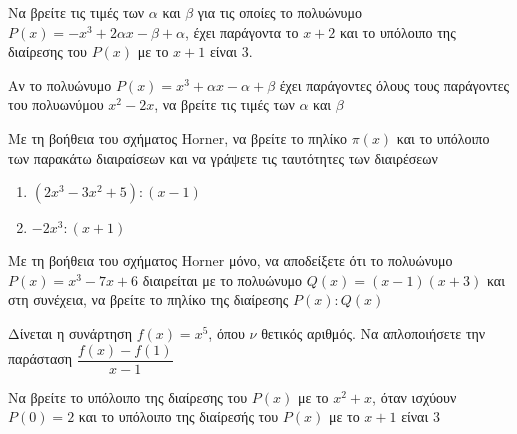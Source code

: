 \documentclass{../presentation}
\begin{document}
\begin{askisi}
  Να βρείτε τις τιμές των $α$ και $β$ για τις οποίες το πολυώνυμο $P(x)=-x^3+2αx-β+α$, έχει παράγοντα το $x+2$ και το υπόλοιπο της διαίρεσης του $P(x)$ με το $x+1$ είναι 3.


\end{askisi}

\begin{askisi}
  Αν το πολυώνυμο $P(x)=x^3+αx-α+β$ έχει παράγοντες όλους τους παράγοντες του πολυωνύμου $x^2-2x$, να βρείτε τις τιμές των $α$ και $β$


\end{askisi}

\begin{askisi}
  Με τη βοήθεια του σχήματος Horner, να βρείτε το πηλίκο $π(x)$ και το υπόλοιπο των παρακάτω διαιραίσεων και να γράψετε τις ταυτότητες των διαιρέσεων
  \begin{enumerate}
    \item<1-> $(2x^3-3x^2+5):(x-1)$
    \item<2-> $-2x^3:(x+1)$
  \end{enumerate}


\end{askisi}

\begin{askisi}
  Με τη βοήθεια του σχήματος Horner μόνο, να αποδείξετε ότι το πολυώνυμο $P(x)=x^3-7x+6$ διαιρείται με το πολυώνυμο $Q(x)=(x-1)(x+3)$ και στη συνέχεια, να βρείτε το πηλίκο της διαίρεσης $P(x):Q(x)$


\end{askisi}

\begin{askisi}
  Δίνεται η συνάρτηση $f(x)=x^5$, όπου $ν$ θετικός αριθμός. Να απλοποιήσετε την παράσταση $\dfrac{f(x)-f(1)}{x-1}$


\end{askisi}

\begin{askisi}
  Να βρείτε το υπόλοιπο της διαίρεσης του $P(x)$ με το $x^2+x$, όταν ισχύουν $P(0)=2$ και το υπόλοιπο της διαίρεσής του $P(x)$ με το $x+1$ είναι $3$


\end{askisi}
\end{document}
